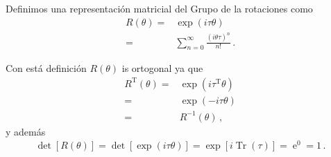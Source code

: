 Definimos una representación matricial del Grupo de la rotaciones como
\begin{align}
  \label{eq:tye}
  R(\theta)=&\exp \left(i \tau \theta  \right) \nonumber\\
=&\sum_{n=0}^{\infty}\frac{\left(i \theta\tau \right)^{n}}{n!}\,.
\end{align}

Con está definición $R(\theta)$ is ortogonal ya que
\begin{align}
  R^{\operatorname{T}}(\theta)=& \exp \left(i \tau^{\operatorname{T}} \theta  \right) \nonumber\\
        =& \exp \left(-i \tau \theta  \right) \nonumber\\
        =&R^{-1}(\theta)\,,
\end{align}
y además
\begin{align}
  \operatorname{det}[R(\theta)]=\operatorname{det} \left[ \exp \left(i \tau \theta  \right)  \right]
  =\exp \left[ i \operatorname{Tr}(\tau) \right]=\operatorname{e}^0=1\,.
\end{align}





